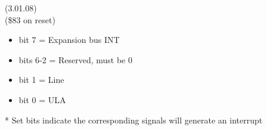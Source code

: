  (3.01.08)\\
(\$83 on reset)
\begin{itemize}
\item bit 7 = Expansion bus INT
\item bits 6-2 = Reserved, must be 0
\item bit 1 = Line
\item bit 0 = ULA
\end{itemize}
* Set bits indicate the corresponding signals will generate an interrupt

